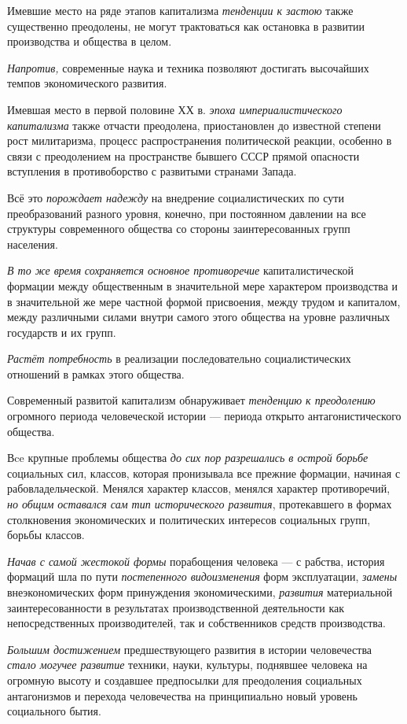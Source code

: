 \documentclass[a4paper,14pt,russian]{extreport}
\begin{document}
Имевшие место на ряде этапов капитализма \emph{тенденции к застою} также существенно преодолены, не могут трактоваться как остановка в развитии производства и общества в целом.

\emph{Напротив,} современные наука и техника позволяют достигать высочайших темпов экономического развития.

Имевшая место в первой половине ХХ в. \emph{эпоха империалистического капитализма} также отчасти преодолена, приостановлен до известной степени рост милитаризма, процесс распространения политической реакции, особенно в связи с преодолением на пространстве бывшего СССР прямой опасности вступления в противоборство с развитыми странами Запада.

Всё это \emph{порождает надежду} на внедрение социалистических по сути преобразований разного уровня, конечно, при постоянном давлении на все структуры современного общества со стороны заинтересованных групп населения.

\emph{В то же время} \emph{сохраняется основное противоречие} капиталистической формации между общественным в значительной мере характером производства и в значительной же мере частной формой присвоения, между трудом и капиталом, между различными силами внутри самого этого общества на уровне различных государств и их групп.

\emph{Растёт потребность} в реализации последовательно социалистических отношений в рамках этого общества.

Современный развитой капитализм обнаруживает \emph{тенденцию к преодолению} огромного периода человеческой истории --- периода открыто антагонистического общества.

Вce крупные проблемы общества \emph{до сих пор разрешались в острой борьбе} социальных сил, классов, которая пронизывала все прежние формации, начиная с рабовладельческой. Менялся характер классов, менялся характер противоречий, \emph{но общим оставался сам тип исторического развития}, протекавшего в формах столкновения экономических и политических интересов социальных групп, борьбы классов.

\emph{Начав с самой жестокой формы} порабощения человека --- с рабства, история формаций шла по пути \emph{постепенного видоизменения} форм эксплуатации, \emph{замены} внеэкономических форм принуждения экономическими, \emph{развития} материальной заинтересованности в результатах производственной деятельности как непосредственных производителей, так и собственников средств производства.

\emph{Большим достижением} предшествующего развития в истории человечества \emph{стало могучее развитие} техники, науки, культуры, поднявшее человека на огромную высоту и создавшее предпосылки для преодоления социальных антагонизмов и перехода человечества на принципиально новый уровень социального бытия.
\end{document}
